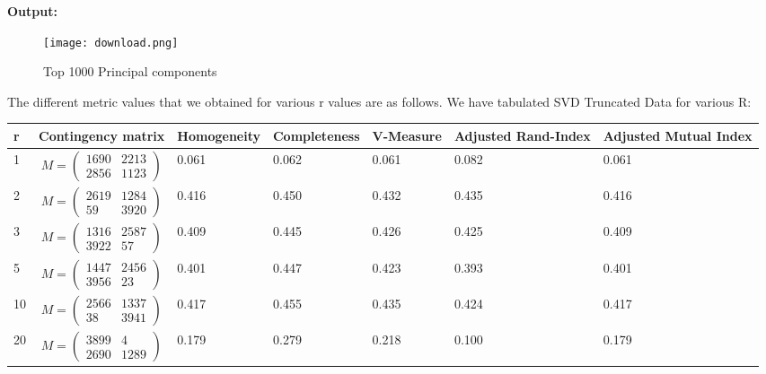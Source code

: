 \documentclass{article}
\begin{document}
\textbf{Output:}
\begin{figure}[h]
	\centering
	\texttt{[image: download.png]}
	\caption{Top 1000 Principal components}
\end{figure}

The different metric values that we obtained for various r values are as follows. We have tabulated SVD Truncated Data for various R:\\

\begin{center}
	\begin{tabular}{ | m{1cm} | m{3cm}| m{2cm} | m{2cm} | m{2cm} | m{2cm} | m{2cm} | } 
		\hline
		r& Contingency matrix & Homogeneity& Completeness& V-Measure& Adjusted Rand-Index& Adjusted Mutual Index \\ 
		\hline
		1 & $$ M = \left( \begin{smallmatrix} 1690&2213\\ 2856&1123 \end{smallmatrix} \right) $$ & 0.061& 0.062& 0.061& 0.082& 0.061 \\ 
		\hline
		2 & $$ M = \left( \begin{smallmatrix} 2619&1284\\ 59&3920 \end{smallmatrix} \right) $$ & 0.416& 0.450& 0.432& 0.435& 0.416 \\ 
		\hline
		3 & $$ M = \left( \begin{smallmatrix} 1316&2587\\ 3922&57 \end{smallmatrix} \right) $$ & 0.409& 0.445& 0.426& 0.425& 0.409\\
		\hline
		5& $$ M = \left( \begin{smallmatrix} 1447&2456\\ 3956&23 \end{smallmatrix} \right) $$ & 0.401& 0.447& 0.423& 0.393& 0.401\\
		\hline
		10 & $$ M = \left( \begin{smallmatrix} 2566&1337\\ 38&3941 \end{smallmatrix} \right) $$ & 0.417& 0.455& 0.435& 0.424& 0.417\\
		\hline
		20 & $$ M = \left( \begin{smallmatrix} 3899&4\\ 2690&1289 \end{smallmatrix} \right) $$ & 0.179& 0.279& 0.218& 0.100& 0.179\\

\end{tabular}
\end{center}
\end{document}
